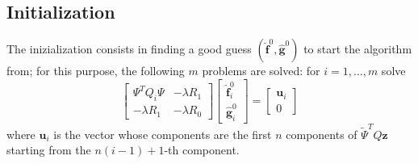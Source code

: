 \subsection{Initialization}
The inizialization consists in finding a good guess $(\hat{\mathbf{f}}^0,\hat{\mathbf{g}}^0)$ to start the algorithm from; for this purpose, the following $m$ problems are solved: for $i = 1, \dots, m$ solve
\begin{equation}
        \begin{bmatrix}
            \Psi^TQ_i\Psi & -\lambda R_1\\
            -\lambda R_1  & -\lambda R_0
        \end{bmatrix}
        \begin{bmatrix}
            \hat{\mathbf{f}}_i^0\\
            \hat{\mathbf{g}}_i^0
        \end{bmatrix}
        =
        \begin{bmatrix}
            \mathbf{u}_i\\
            0
        \end{bmatrix}
\end{equation}
where $\mathbf{u}_i$ is the vector whose components are the first $n$ components of $\tilde{\Psi}^T Q\mathbf{z}$ starting from the $n(i-1) +1$-th component.

